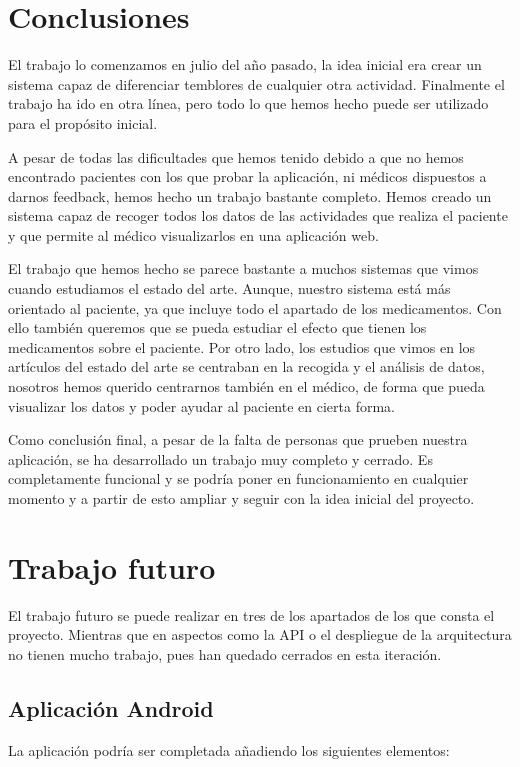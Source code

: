 \documentclass[11pt,spanish]{article}
\begin{document}
\section{Conclusiones}
El trabajo lo comenzamos en julio del año pasado, la idea inicial era crear un sistema capaz de diferenciar temblores de cualquier otra actividad. Finalmente el trabajo ha ido en otra línea, pero todo lo que hemos hecho puede ser utilizado para el propósito inicial.
\newline

A pesar de todas las dificultades que hemos tenido debido a que no hemos encontrado pacientes con los que probar la aplicación, ni médicos dispuestos a darnos feedback, hemos hecho un trabajo bastante completo. Hemos creado un sistema capaz de recoger todos los datos de las actividades que realiza el paciente y que permite al médico visualizarlos en una aplicación web.
\newline

El trabajo que hemos hecho se parece bastante a muchos sistemas que vimos cuando estudiamos el estado del arte. Aunque, nuestro sistema está más orientado al paciente, ya que incluye todo el apartado de los medicamentos. Con ello también queremos que se pueda estudiar el efecto que tienen los medicamentos sobre el paciente. Por otro lado, los estudios que vimos en los artículos del estado del arte se centraban en la recogida y el análisis de datos, nosotros hemos querido centrarnos también en el médico, de forma que pueda visualizar los datos y poder ayudar al paciente en cierta forma.
\newline

Como conclusión final, a pesar de la falta de personas que prueben nuestra aplicación, se ha desarrollado un trabajo muy completo y cerrado. Es completamente funcional y se podría poner en funcionamiento en cualquier momento y a partir de esto ampliar y seguir con la idea inicial del proyecto.
\newpage

\section{Trabajo futuro}
El trabajo futuro se puede realizar en tres de los apartados de los que consta el proyecto. Mientras que en aspectos como la API o el despliegue de la arquitectura no tienen mucho trabajo, pues han quedado cerrados en esta iteración.

\subsection{Aplicación Android}
La aplicación podría ser completada añadiendo los siguientes elementos:
\end{document}
